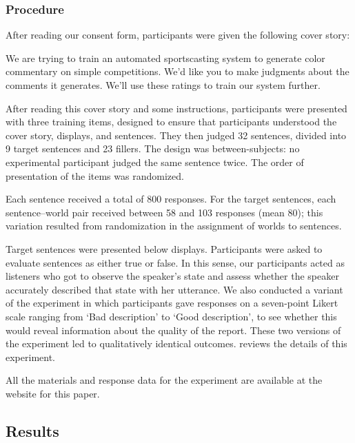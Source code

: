 \documentclass[leqno,12pt]{article}
\begin{document}
\subsubsection{Procedure} 

After reading our consent form, participants were given the following
cover story:
%
\begin{examples}
\item\label{coverstory} We are trying to train an automated
  sportscasting system to generate color commentary on simple
  competitions. We'd like you to make judgments about the comments it
  generates. We'll use these ratings to train our system further.
\end{examples}

After reading this cover story and some instructions, participants
were presented with three training items, designed to ensure that
participants understood the cover story, displays, and sentences. They
then judged 32 sentences, divided into 9 target sentences and 23
fillers. The design was between-subjects: no experimental participant
judged the same sentence twice. The order of presentation of the items
was randomized.
 
Each sentence received a total of 800 responses. For the target
sentences, each sentence--world pair received between 58 and 103
responses (mean 80); this variation resulted from randomization in the
assignment of worlds to sentences.

Target sentences were presented below displays. Participants were
asked to evaluate sentences as either true or false. In this sense,
our participants acted as listeners who got to observe the speaker's
state and assess whether the speaker accurately described that state
with her utterance. We also conducted a variant of the experiment in
which participants gave responses on a seven-point Likert scale
ranging from `Bad description' to `Good description', to see whether
this would reveal information about the quality of the report. These
two versions of the experiment led to qualitatively identical
outcomes.  reviews the details of this
experiment.

All the materials and response data for the experiment are available
at the website for this paper.


\subsection{Results}\label{sec:binary:results}
\end{document}

